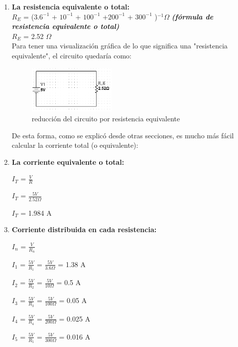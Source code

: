 \documentclass[a4paper,11pt]{article}
\begin{document}
\begin{enumerate}
    \item \textbf{La resistencia equivalente o total:}
    \vspace{0.3cm}\\
    $R_E$ = ($3.6^{-1}$ + $10^{-1}$ + $100^{-1}$ +$200^{-1}$ + $300^{-1}$ )$^{-1}$$\Omega$ \textcolor[cmyk]{1,0,1,0}{\textbf{\textit{(fórmula de resistencia equivalente o total)}}}
    \vspace{0.3cm}\\
    $R_E$ = 2.52 $\Omega$
    \vspace{0.3cm}\\
    \noindent Para tener una visualización gráfica de lo que significa una "resistencia equivalente", el circuito quedaría como:

    \begin{figure}[H]
        \centering
        \includegraphics[width=0.4\textwidth]{images/equivalente3.PNG}
        \caption{reducción del circuito por resistencia equivalente}
        \label{fg:e1}
    \end{figure}
    \noindent De esta forma, como se explicó desde otras secciones, es mucho más fácil calcular la corriente total (o equivalente):
    \item \textbf{La corriente equivalente o total:}
    
    $I_T$ = $\frac{V}{R}$

    $I_T$ = $\frac{5V}{2.52 \Omega}$

    $I_T$ = 1.984 A 
    \item \textbf{Corriente distribuida en cada resistencia:}
    
    $I_n$ = $\frac{V}{R_n}$

    $I_1$ = $\frac{5V}{R_1}$ = $\frac{5V}{3.6 \Omega}$ = 1.38 A

    $I_2$ = $\frac{5V}{R_2}$ = $\frac{5V}{10 \Omega}$ = 0.5 A

    $I_3$ = $\frac{5V}{R_3}$ = $\frac{5V}{100 \Omega}$ = 0.05 A

    $I_4$ = $\frac{5V}{R_4}$ = $\frac{5V}{200 \Omega}$ = 0.025 A

    $I_5$ = $\frac{5V}{R_5}$ = $\frac{5V}{300 \Omega}$ = 0.016 A


\end{enumerate}
\end{document}

